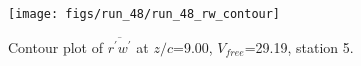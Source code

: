 \begin{figure}[H]
\centering
\texttt{[image: figs/run\_48/run\_48\_rw\_contour]}
\caption{Contour plot of $\overline{r^\prime w^\prime}$ at $z/c$=9.00, $V_{free}$=29.19, station 5.}
\label{fig:run_48_rw_contour}
\end{figure}


